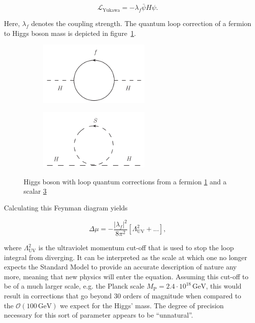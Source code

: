 \begin{equation}
  \label{eq:yukawacoup}
  \mathcal{L}_{\text{Yukawa}} = - \lambda_f \bar{\psi} H \psi.
\end{equation}

\noindent Here, $\lambda_f$ denotes the coupling strength. The quantum loop correction of a fermion to Higgs boson mass is depicted in figure~\ref{fig:higgsfloop}.

\begin{figure}[ht!]
  \centering
  \begin{subfigure}[b]{0.49\textwidth}
    \centering
    \includegraphics[width=0.6\textwidth]{plots/higgsfloop.pdf}
    \caption{}
    \label{fig:higgsfloop}
  \end{subfigure}
  \begin{subfigure}[b]{0.49\textwidth}
    \centering
    \includegraphics[width=0.6\textwidth]{plots/higgssloop.pdf}
    \caption{}
    \label{fig:higgssloop}
  \end{subfigure}
  \caption{Higgs boson with loop quantum corrections from a fermion \ref{fig:higgsfloop} and a scalar \ref{fig:higgssloop}}
\end{figure}

\noindent Calculating this Feynman diagram yields

\begin{equation}
  \label{eq:higgsfcorr}
  \Delta \mu = - \frac{|\lambda_f|^2}{8 \pi^2} \left[ \Lambda^2_{\text{UV}} + ... \right],
\end{equation}

\noindent where $\Lambda^2_{\text{UV}}$ is the ultraviolet momentum cut-off that is used to stop the loop integral from diverging. It can be interpreted as the scale at which one no longer expects the Standard Model to provide an accurate description of nature any more, meaning that new physics will enter the equation. Assuming this cut-off to be of a much larger scale, e.g. the Planck scale $M_{\text{P}} = 2.4 \cdot 10^{18}\,\text{GeV}$, this would result in corrections that go beyond 30 orders of magnitude when compared to the $\mathcal{O}(100\,\text{GeV})$ we expect for the Higgs' mass. The degree of precision necessary for this sort of parameter appears to be ``unnatural''.

